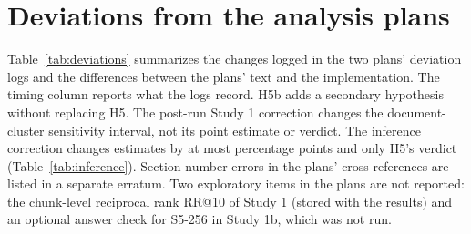 \documentclass[11pt]{article}
\begin{document}
\section{Deviations from the analysis plans}\label{app:deviations}
Table~\ref{tab:deviations} summarizes the changes logged in the two plans' deviation logs and the differences between the plans' text and the implementation. The timing column reports what the logs record. H5b adds a secondary hypothesis without replacing H5. The post-run Study 1 correction changes the document-cluster sensitivity interval, not its point estimate or verdict. The inference correction changes estimates by at most \InferenceShiftMax{} percentage points and only H5's verdict (Table~\ref{tab:inference}). Section-number errors in the plans' cross-references are listed in a separate erratum. Two exploratory items in the plans are not reported: the chunk-level reciprocal rank RR@10 of Study 1 (stored with the results) and an optional answer check for S5-256 in Study 1b, which was not run.
\end{document}
